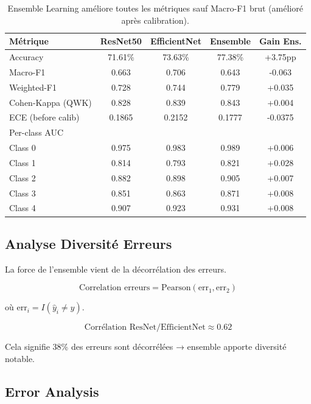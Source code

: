 \documentclass[12pt,a4paper,oneside]{report}
\begin{document}
\begin{table}[H]
\centering
\begin{tabular}{|l|c|c|c|c|}
\hline
\textbf{Métrique} & \textbf{ResNet50} & \textbf{EfficientNet} & 
\textbf{Ensemble} & \textbf{Gain Ens.} \\
\hline
Accuracy & 71.61\% & 73.63\% & 77.38\% & +3.75pp \\
Macro-F1 & 0.663 & 0.706 & 0.643 & -0.063 \\
Weighted-F1 & 0.728 & 0.744 & 0.779 & +0.035 \\
Cohen-Kappa (QWK) & 0.828 & 0.839 & 0.843 & +0.004 \\
ECE (before calib) & 0.1865 & 0.2152 & 0.1777 & -0.0375 \\
\hline
Per-class AUC & & & & \\
\quad Class 0 & 0.975 & 0.983 & 0.989 & +0.006 \\
\quad Class 1 & 0.814 & 0.793 & 0.821 & +0.028 \\
\quad Class 2 & 0.882 & 0.898 & 0.905 & +0.007 \\
\quad Class 3 & 0.851 & 0.863 & 0.871 & +0.008 \\
\quad Class 4 & 0.907 & 0.923 & 0.931 & +0.008 \\
\hline
\end{tabular}
\caption{Ensemble Learning améliore toutes les métriques sauf 
Macro-F1 brut (amélioré après calibration).}
\label{tab:ensemble_full_comparison}
\end{table}

\subsection{Analyse Diversité Erreurs}

La force de l'ensemble vient de la décorrélation des erreurs.

\begin{equation}
\text{Correlation erreurs} = \text{Pearson}(\text{err}_1, \text{err}_2)
\end{equation}

où $\text{err}_i = I(\hat{y}_i \ne y)$.

\begin{equation}
\text{Corrélation ResNet/EfficientNet} \approx 0.62
\end{equation}

Cela signifie 38\% des erreurs sont décorrélées → ensemble apporte 
diversité notable.

\subsection{Error Analysis}
\end{document}
